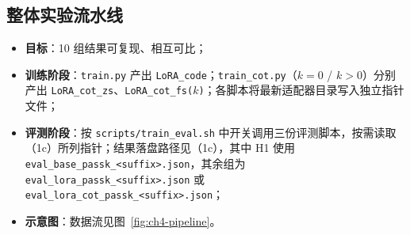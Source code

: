 \subsection{整体实验流水线}
\begin{itemize}
    \item \textbf{目标}：10 组结果可复现、相互可比；
    \item \textbf{训练阶段}：\texttt{train.py} 产出 \texttt{LoRA\_code}；\texttt{train\_cot.py}（$k{=}0$ / $k{>}0$）分别产出 \texttt{LoRA\_cot\_zs}、\texttt{LoRA\_cot\_fs($k$)}；各脚本将最新适配器目录写入独立指针文件；
    \item \textbf{评测阶段}：按 \texttt{scripts/train\_eval.sh} 中开关调用三份评测脚本，按需读取（1c）所列指针；结果落盘路径见（1c），其中 H1 使用 \texttt{eval\_base\_passk\_\allowbreak <suffix>.json}，其余组为 \texttt{eval\_lora\_passk\_<suffix>.json} 或 \texttt{eval\_lora\_cot\_passk\_<suffix>.json}；
    \item \textbf{示意图}：数据流见图~\ref{fig:ch4-pipeline}。
\end{itemize}

